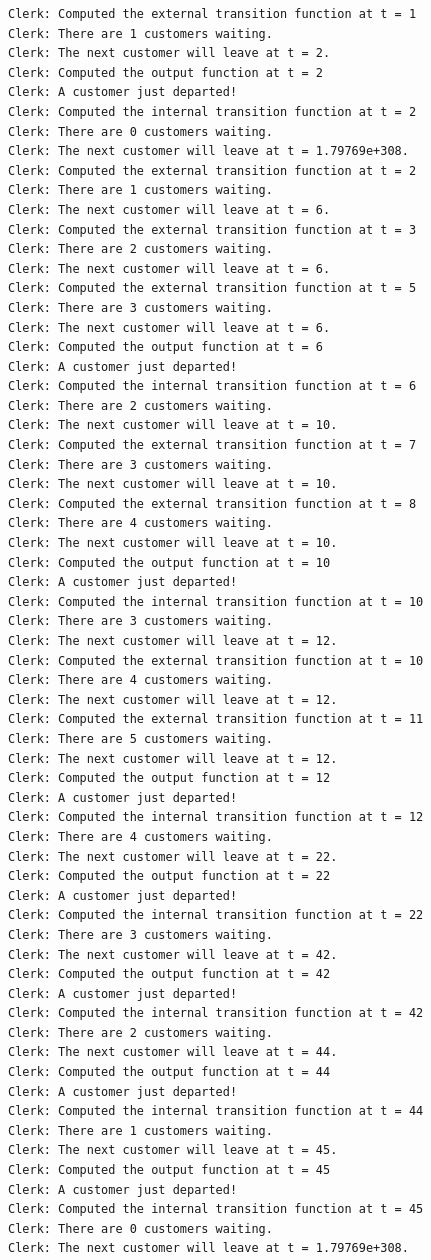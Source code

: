 \begin{verbatim}
Clerk: Computed the external transition function at t = 1
Clerk: There are 1 customers waiting.
Clerk: The next customer will leave at t = 2.
Clerk: Computed the output function at t = 2
Clerk: A customer just departed!
Clerk: Computed the internal transition function at t = 2
Clerk: There are 0 customers waiting.
Clerk: The next customer will leave at t = 1.79769e+308.
Clerk: Computed the external transition function at t = 2
Clerk: There are 1 customers waiting.
Clerk: The next customer will leave at t = 6.
Clerk: Computed the external transition function at t = 3
Clerk: There are 2 customers waiting.
Clerk: The next customer will leave at t = 6.
Clerk: Computed the external transition function at t = 5
Clerk: There are 3 customers waiting.
Clerk: The next customer will leave at t = 6.
Clerk: Computed the output function at t = 6
Clerk: A customer just departed!
Clerk: Computed the internal transition function at t = 6
Clerk: There are 2 customers waiting.
Clerk: The next customer will leave at t = 10.
Clerk: Computed the external transition function at t = 7
Clerk: There are 3 customers waiting.
Clerk: The next customer will leave at t = 10.
Clerk: Computed the external transition function at t = 8
Clerk: There are 4 customers waiting.
Clerk: The next customer will leave at t = 10.
Clerk: Computed the output function at t = 10
Clerk: A customer just departed!
Clerk: Computed the internal transition function at t = 10
Clerk: There are 3 customers waiting.
Clerk: The next customer will leave at t = 12.
Clerk: Computed the external transition function at t = 10
Clerk: There are 4 customers waiting.
Clerk: The next customer will leave at t = 12.
Clerk: Computed the external transition function at t = 11
Clerk: There are 5 customers waiting.
Clerk: The next customer will leave at t = 12.
Clerk: Computed the output function at t = 12
Clerk: A customer just departed!
Clerk: Computed the internal transition function at t = 12
Clerk: There are 4 customers waiting.
Clerk: The next customer will leave at t = 22.
Clerk: Computed the output function at t = 22
Clerk: A customer just departed!
Clerk: Computed the internal transition function at t = 22
Clerk: There are 3 customers waiting.
Clerk: The next customer will leave at t = 42.
Clerk: Computed the output function at t = 42
Clerk: A customer just departed!
Clerk: Computed the internal transition function at t = 42
Clerk: There are 2 customers waiting.
Clerk: The next customer will leave at t = 44.
Clerk: Computed the output function at t = 44
Clerk: A customer just departed!
Clerk: Computed the internal transition function at t = 44
Clerk: There are 1 customers waiting.
Clerk: The next customer will leave at t = 45.
Clerk: Computed the output function at t = 45
Clerk: A customer just departed!
Clerk: Computed the internal transition function at t = 45
Clerk: There are 0 customers waiting.
Clerk: The next customer will leave at t = 1.79769e+308.
\end{verbatim}


